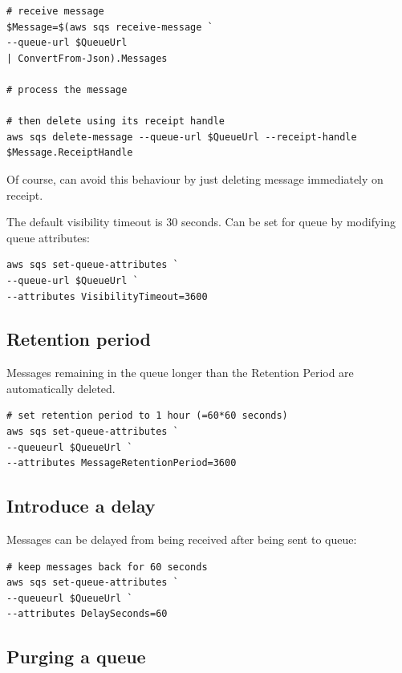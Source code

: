 \documentclass{pgnotes}
\begin{document}
\begin{verbatim}
# receive message
$Message=$(aws sqs receive-message `
--queue-url $QueueUrl 
| ConvertFrom-Json).Messages 

# process the message

# then delete using its receipt handle
aws sqs delete-message --queue-url $QueueUrl --receipt-handle $Message.ReceiptHandle
\end{verbatim}

Of course, can avoid this behaviour by just deleting message immediately
on receipt.

The default visibility timeout is 30 seconds. Can be set for queue by
modifying queue attributes:

\begin{verbatim}
aws sqs set-queue-attributes `
--queue-url $QueueUrl `
--attributes VisibilityTimeout=3600
\end{verbatim}

\subsection{Retention period}\label{retention-period}

Messages remaining in the queue longer than the Retention Period are
automatically deleted.

\begin{verbatim}
# set retention period to 1 hour (=60*60 seconds)
aws sqs set-queue-attributes `
--queueurl $QueueUrl `
--attributes MessageRetentionPeriod=3600
\end{verbatim}

\subsection{Introduce a delay}\label{introduce-a-delay}

Messages can be delayed from being received after being sent to queue:

\begin{verbatim}
# keep messages back for 60 seconds
aws sqs set-queue-attributes `
--queueurl $QueueUrl `
--attributes DelaySeconds=60
\end{verbatim}

\subsection{Purging a queue}\label{purging-a-queue}
\end{document}
